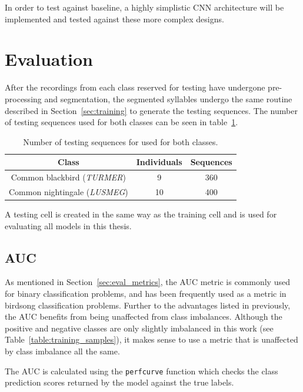 In order to test against baseline, a highly simplistic CNN architecture will be
implemented and tested against these more complex designs.

\section{Evaluation}

After the recordings from each class reserved for testing have undergone
pre-processing and segmentation, the segmented syllables undergo the same
routine described in Section~\ref{sec:training} to generate the testing
sequences. The number of testing sequences used for both classes can be seen in
table~\ref{table:testing_samples}.

\begin{table}[h!t]
\begin{center}
\begin{tabular}{c c c}
\toprule
Class & Individuals & Sequences \\ [0.5ex]
\midrule
Common blackbird (\textit{TURMER}) & 9 & 360 \\
Common nightingale (\textit{LUSMEG}) & 10 & 400 \\
\bottomrule
\end{tabular}
\caption{Number of testing sequences for used for both
classes.}\label{table:testing_samples}
\end{center}
\end{table}

A testing cell is created in the same way as the training cell and is used for
evaluating all models in this thesis.

\subsection{AUC}

As mentioned in Section~\ref{sec:eval_metrics}, the AUC metric is commonly used
for binary classification problems, and has been frequently used as a metric in
birdsong classification problems. Further to the advantages listed in 
previously, the AUC benefits from being unaffected from class imbalances.
Although the positive and negative classes are only slightly imbalanced in this
work (see Table~\ref{table:training_samples}), it makes sense to use a metric
that is unaffected by class imbalance all the same.

The AUC is calculated using the \texttt{perfcurve} function which checks the
class prediction scores returned by the model against the true labels.

